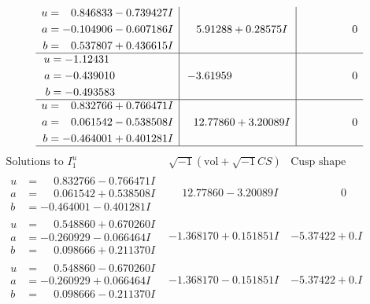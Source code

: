 \documentclass[1p]{elsarticle_modified}
\theoremstyle{definition}
\newcommand{\I}{\sqrt{-1}}
\begin{document}
$$\begin{array}{c|c|c}
\begin{aligned}
u &= \phantom{-}0.846833 - 0.739427 I \\
a &= -0.104906 - 0.607186 I \\
b &= \phantom{-}0.537807 + 0.436615 I\end{aligned}
 & \phantom{-}5.91288 + 0.28575 I & \phantom{-0.000000 } 0 \\ \hline\begin{aligned}
u &= -1.12431\phantom{ +0.000000I} \\
a &= -0.439010\phantom{ +0.000000I} \\
b &= -0.493583\phantom{ +0.000000I}\end{aligned}
 & -3.61959\phantom{ +0.000000I} & \phantom{-0.000000 } 0 \\ \hline\begin{aligned}
u &= \phantom{-}0.832766 + 0.766471 I \\
a &= \phantom{-}0.061542 - 0.538508 I \\
b &= -0.464001 + 0.401281 I\end{aligned}
 & \phantom{-}12.77860 + 3.20089 I & \phantom{-0.000000 } 0\\
 \hline 
 \end{array}$$\newpage$$\begin{array}{c|c|c}  
\text{Solutions to }I^u_{1}& \I (\text{vol} + \sqrt{-1}CS) & \text{Cusp shape}\\
 \hline 
\begin{aligned}
u &= \phantom{-}0.832766 - 0.766471 I \\
a &= \phantom{-}0.061542 + 0.538508 I \\
b &= -0.464001 - 0.401281 I\end{aligned}
 & \phantom{-}12.77860 - 3.20089 I & \phantom{-0.000000 } 0 \\ \hline\begin{aligned}
u &= \phantom{-}0.548860 + 0.670260 I \\
a &= -0.260929 - 0.066464 I \\
b &= \phantom{-}0.098666 + 0.211370 I\end{aligned}
 & -1.368170 + 0.151851 I & -5.37422 + 0. I\phantom{ +0.000000I} \\ \hline\begin{aligned}
u &= \phantom{-}0.548860 - 0.670260 I \\
a &= -0.260929 + 0.066464 I \\
b &= \phantom{-}0.098666 - 0.211370 I\end{aligned}
 & -1.368170 - 0.151851 I & -5.37422 + 0. I\phantom{ +0.000000I} \\ \hline\begin{aligned}

\end{aligned}
\end{array}$$
\end{document}
